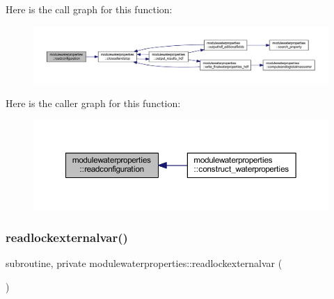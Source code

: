 Here is the call graph for this function\+:\nopagebreak
\begin{figure}[H]
\begin{center}
\leavevmode
\includegraphics[width=350pt]{namespacemodulewaterproperties_abba5d253e1014bd117f71c0ea3a37d58_cgraph}
\end{center}
\end{figure}
Here is the caller graph for this function\+:\nopagebreak
\begin{figure}[H]
\begin{center}
\leavevmode
\includegraphics[width=350pt]{namespacemodulewaterproperties_abba5d253e1014bd117f71c0ea3a37d58_icgraph}
\end{center}
\end{figure}
\mbox{\label{namespacemodulewaterproperties_a463922f7665f0f3507bff58df80af6f7}} 
\subsubsection{\texorpdfstring{readlockexternalvar()}{readlockexternalvar()}}
{\footnotesize\ttfamily subroutine, private modulewaterproperties\+::readlockexternalvar (\begin{DoxyParamCaption}{ }\end{DoxyParamCaption})\hspace{0.3cm}{\ttfamily [private]}}

